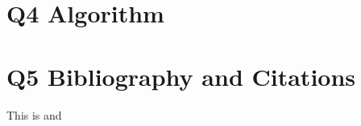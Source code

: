 \documentclass{article}
\begin{document}
	\section*{Q4 Algorithm}
	\begin{algorithm}
	\end{algorithm}
	\section*{Q5 Bibliography and Citations}
	This is \cite{turing1950computing} and 
	\citep{knuth1997art} \\
	\citet{turing1950computing}
	
	
\end{document}
